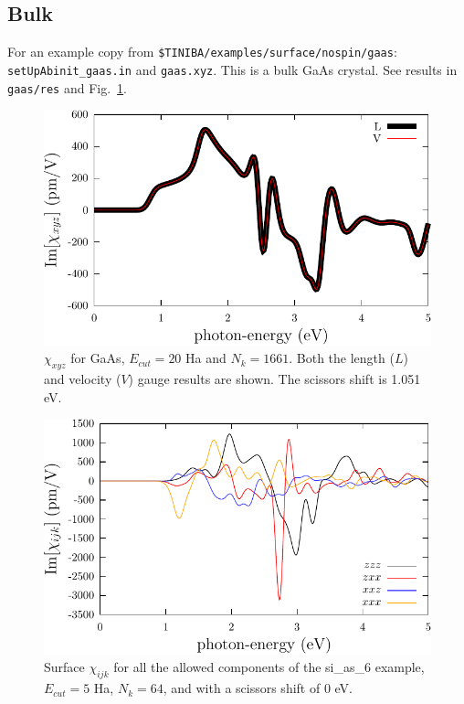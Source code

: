 \documentclass[openany,oneside]{book}
\numberwithin{equation}{section}
\begin{document}
\subsection{Bulk} 
For an example copy from \verb=$TINIBA/examples/surface/nospin/gaas=:\\
\verb=setUpAbinit_gaas.in= and \verb=gaas.xyz=. This is a
bulk GaAs crystal. See results in \verb=gaas/res= and Fig.~\ref{shg-bulk}.
\begin{figure}[t]
\begin{center}
\includegraphics[scale=0.5]{plots/shg-bulk}
\end{center}
\caption{$\chi_{xyz}$ for GaAs, $E_{cut}=20$ Ha and $N_k=1661$. Both
  the length ($L$) and velocity ($V$) gauge results are shown.
The scissors shift is 1.051 eV.
}
\label{shg-bulk}
\end{figure}
\begin{figure}[t]
\begin{center}
\includegraphics[scale=0.5]{plots/shg-surface}
\end{center}
\caption{Surface $\chi_{ijk}$ for all the allowed components of the
  si\_as\_6 example, $E_{cut}=5$ 
  Ha, $N_k=64$, and with a scissors shift of 0 eV. 
}
\label{shg-surface}
\end{figure}
\end{document}
